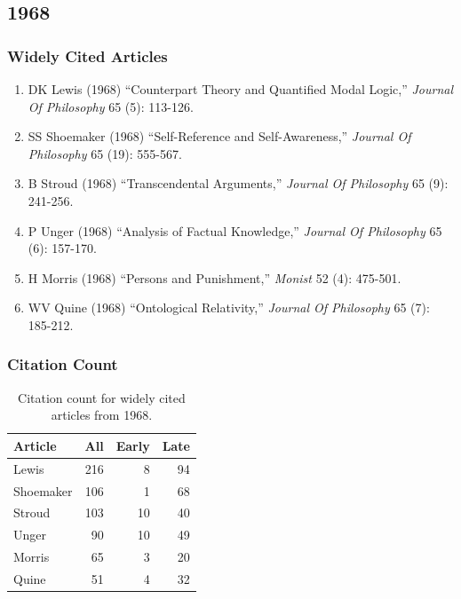 \documentclass[
  10pt,
  letterpaper,
  DIV=11,
  numbers=noendperiod,
  twoside]{scrartcl}
\providecommand{\tightlist}{%
  \setlength{\itemsep}{0pt}\setlength{\parskip}{0pt}}\usepackage{longtable,booktabs,array}
\begin{document}
\newpage

\subsection{1968}\label{sec-s1968}

\subsubsection*{Widely Cited Articles}\label{widely-cited-articles-12}

\begin{enumerate}
\def\labelenumi{\arabic{enumi}.}
\tightlist
\item
  DK Lewis (1968) ``Counterpart Theory and Quantified Modal Logic,''
  \emph{Journal Of Philosophy} 65 (5): 113-126.
\item
  SS Shoemaker (1968) ``Self-Reference and Self-Awareness,''
  \emph{Journal Of Philosophy} 65 (19): 555-567.
\item
  B Stroud (1968) ``Transcendental Arguments,'' \emph{Journal Of
  Philosophy} 65 (9): 241-256.
\item
  P Unger (1968) ``Analysis of Factual Knowledge,'' \emph{Journal Of
  Philosophy} 65 (6): 157-170.
\item
  H Morris (1968) ``Persons and Punishment,'' \emph{Monist} 52 (4):
  475-501.
\item
  WV Quine (1968) ``Ontological Relativity,'' \emph{Journal Of
  Philosophy} 65 (7): 185-212.
\end{enumerate}

\subsubsection*{Citation Count}\label{sec-count-1968}

\begin{longtable}[]{@{}lrrr@{}}

\caption{\label{tbl-citation-count-1968}Citation count for widely cited
articles from 1968.}

\tabularnewline

\toprule\noalign{}
Article & All & Early & Late \\
\midrule\noalign{}
\endhead
\bottomrule\noalign{}
\endlastfoot
Lewis & 216 & 8 & 94 \\
Shoemaker & 106 & 1 & 68 \\
Stroud & 103 & 10 & 40 \\
Unger & 90 & 10 & 49 \\
Morris & 65 & 3 & 20 \\
Quine & 51 & 4 & 32 \\

\end{longtable}
\end{document}
